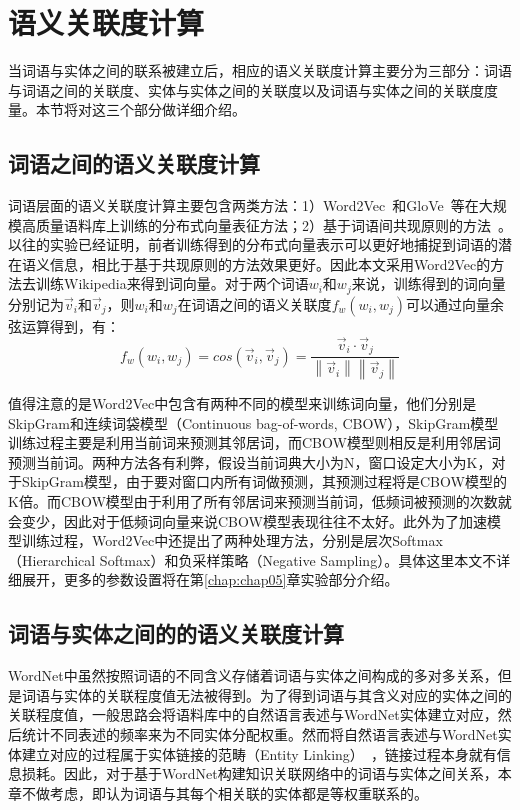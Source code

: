 \section{语义关联度计算}
当词语与实体之间的联系被建立后，相应的语义关联度计算主要分为三部分：词语与词语之间的关联度、实体与实体之间的关联度以及词语与实体之间的关联度度量。本节将对这三个部分做详细介绍。

\subsection{词语之间的语义关联度计算}
\label{word2vec}
词语层面的语义关联度计算主要包含两类方法：1）Word2Vec~\cite{corr/Mikolov13}和GloVe~\cite{emnlp/PenningtonSM14}等在大规模高质量语料库上训练的分布式向量表征方法；2）基于词语间共现原则的方法~\cite{aaai/StrubeP06, ijcai/GabrilovichM07}。以往的实验已经证明，前者训练得到的分布式向量表示可以更好地捕捉到词语的潜在语义信息，相比于基于共现原则的方法效果更好。因此本文采用Word2Vec的方法去训练Wikipedia来得到词向量。对于两个词语$w_i$和$w_j$来说，训练得到的词向量分别记为$\vec v_i$和$\vec v_j$，则$w_i$和$w_j$在词语之间的语义关联度$f_w(w_i, w_j)$可以通过向量余弦运算得到，有：
\begin{equation}
    \label{cos}
    f_w(w_i, w_j) = cos(\vec v_i,\vec v_j) = \frac{\vec v_i \cdot 
    \vec v_j}{\left \| \vec v_i \right \|\left \| \vec v_j \right \|}
\end{equation}

值得注意的是Word2Vec中包含有两种不同的模型来训练词向量，他们分别是SkipGram和连续词袋模型（Continuous bag-of-words, CBOW），SkipGram模型训练过程主要是利用当前词来预测其邻居词，而CBOW模型则相反是利用邻居词预测当前词。两种方法各有利弊，假设当前词典大小为N，窗口设定大小为K，对于SkipGram模型，由于要对窗口内所有词做预测，其预测过程将是CBOW模型的K倍。而CBOW模型由于利用了所有邻居词来预测当前词，低频词被预测的次数就会变少，因此对于低频词向量来说CBOW模型表现往往不太好。此外为了加速模型训练过程，Word2Vec中还提出了两种处理方法，分别是层次Softmax（Hierarchical Softmax）和负采样策略（Negative Sampling）。具体这里本文不详细展开，更多的参数设置将在第\ref{chap:chap05}章实验部分介绍。

\subsection{词语与实体之间的的语义关联度计算}
WordNet中虽然按照词语的不同含义存储着词语与实体之间构成的多对多关系，但是词语与实体的关联程度值无法被得到。为了得到词语与其含义对应的实体之间的关联程度值，一般思路会将语料库中的自然语言表述与WordNet实体建立对应，然后统计不同表述的频率来为不同实体分配权重。然而将自然语言表述与WordNet实体建立对应的过程属于实体链接的范畴（Entity Linking）~\cite{luwei}，链接过程本身就有信息损耗。因此，对于基于WordNet构建知识关联网络中的词语与实体之间关系，本章不做考虑，即认为词语与其每个相关联的实体都是等权重联系的。

